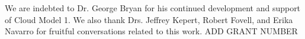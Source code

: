 \documentclass{ametsoc}
\begin{document}




%
\acknowledgments
We are indebted to Dr. George Bryan for his continued development and support of Cloud Model 1.
We also thank Drs. Jeffrey Kepert, Robert Fovell, and Erika Navarro for fruitful conversations related to this work.
ADD GRANT NUMBER

%




\end{document}
